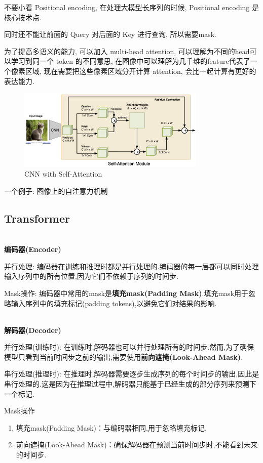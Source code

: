 不要小看 Positional encoding, 在处理大模型长序列的时候, Positional encoding 是核心技术点.

同时还不能让前面的 Query 对后面的 Key 进行查询, 所以需要mask.

为了提高多语义的能力, 可以加入 multi-head attention, 可以理解为不同的head可以学习到同一个 token 的不同意思,
在图像中可以理解为几千维的feature代表了一个像素区域, 现在需要把这些像素区域分开计算 attention, 会比一起计算有更好的表达能力.

\begin{figure}[H]
    \centering
    \includegraphics[width=0.8\textwidth]{figures/image_self_atten.png}
    \caption{CNN with Self-Attention}
    \label{fig:image_self_atten}
\end{figure}

一个例子: 图像上的自注意力机制

\subsection{Transformer}

\textbf{\\编码器(Encoder)}

并行处理:
编码器在训练和推理时都是并行处理的.编码器的每一层都可以同时处理输入序列中的所有位置,因为它们不依赖于序列的时间步.

Mask操作:
编码器中常用的mask是\textbf{填充mask(Padding Mask)}.填充mask用于忽略输入序列中的填充标记(padding tokens),以避免它们对结果的影响.

\textbf{\\解码器(Decoder)}

并行处理(训练时):
在训练时,解码器也可以并行处理所有的时间步.然而,为了确保模型只看到当前时间步之前的输出,需要使用\textbf{前向遮掩(Look-Ahead Mask)}.

串行处理(推理时):
在推理时,解码器需要逐步生成序列的每个时间步的输出,因此是串行处理的.这是因为在推理过程中,解码器只能基于已经生成的部分序列来预测下一个标记.

Mask操作
\begin{enumerate}
    \item 填充mask(Padding Mask)：与编码器相同,用于忽略填充标记.
    \item 前向遮掩(Look-Ahead Mask)：确保解码器在预测当前时间步时,不能看到未来的时间步.
\end{enumerate}

